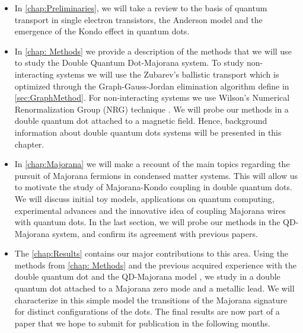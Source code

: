 \begin{itemize}
\item In  \ref{chap:Preliminaries}, we will take a review to the basis of quantum transport in single electron transistors, the Anderson model and the emergence of the Kondo effect in quantum dots. 

 \item In \ref{chap: Methods} we provide a description of the methods that we will use to study the Double Quantum Dot-Majorana system. To study non-interacting systems we will use the Zubarev's ballistic transport\cite{zubarev_double-time_1960} which is optimized through the Graph-Gauss-Jordan elimination algorithm define in \ref{sec:GraphMethod}. For non-interacting systems we use Wilson's Numerical Renormalization Group (NRG) technique \citep{wilson_renormalization_1975}. We will probe our methods in a double quantum dot attached to a magnetic field. Hence, background information about double quantum dots systems will be presented in this chapter. 

\item In \ref{chap:Majorana} we will make a recount of the main topics regarding the pursuit of Majorana fermions in condensed matter systems. This will allow us to motivate the study of Majorana-Kondo coupling in double quantum dots.  We will discuss initial toy models, applications on quantum computing, experimental advances and the innovative idea of coupling Majorana wires with quantum dots. In the last section, we will probe our methods in the QD-Majorana system, and confirm its agreement with previous papers.


\item The  \ref{chap:Results}  contains our major contributions to  this area. Using the methods from \ref{chap: Methods} and the previous acquired experience with the double quantum dot and the QD-Majorana model , we study in a  double quantum dot attached to a Majorana zero mode and a metallic lead. We will characterize in this simple model the transitions of the Majorana signature for distinct configurations of the dots. The final results are now part of a paper that we hope to submit for publication in the following months. 
\end{itemize}
 








